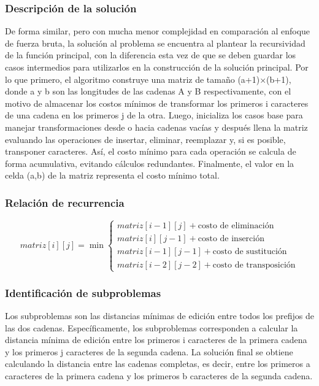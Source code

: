 \subsubsection{Descripción de la solución}

De forma similar, pero con mucha menor complejidad en comparación al enfoque de fuerza bruta, la solución al problema se encuentra al plantear la recursividad de la función principal, con la diferencia esta vez de que se deben guardar los casos intermedios para utilizarlos en la construcción de la solución principal. Por lo que primero, el algoritmo construye una matriz de tamaño (a+1)×(b+1), donde a y b son las longitudes de las cadenas A y B respectivamente, con el motivo de almacenar los costos mínimos de transformar los primeros i caracteres de una cadena en los primeros j de la otra. Luego, inicializa los casos base para manejar transformaciones desde o hacia cadenas vacías y después llena la matriz evaluando las operaciones de insertar, eliminar, reemplazar y, si es posible, transponer caracteres. Así, el costo mínimo para cada operación se calcula de forma acumulativa, evitando cálculos redundantes. Finalmente, el valor en la celda (a,b) de la matriz representa el costo mínimo total.

\subsubsection{Relación de recurrencia}

\begin{equation*}
    matriz[i][j] = \min \begin{cases}
    matriz[i-1][j] + \text{costo de eliminación} \\
    matriz[i][j-1] + \text{costo de inserción} \\
    matriz[i-1][j-1] + \text{costo de sustitución}  \\
    matriz[i-2][j-2] + \text{costo de transposición}
    \end{cases}
\end{equation*}


\subsubsection{Identificación de subproblemas}

Los subproblemas son las distancias mínimas de edición entre todos los prefijos de las dos cadenas. Específicamente, los subproblemas corresponden a calcular la distancia mínima de edición entre los primeros i caracteres de la primera cadena y los primeros j caracteres de la segunda cadena. La solución final se obtiene calculando la distancia entre las cadenas completas, es decir, entre los primeros a caracteres de la primera cadena y los primeros b caracteres de la segunda cadena.


